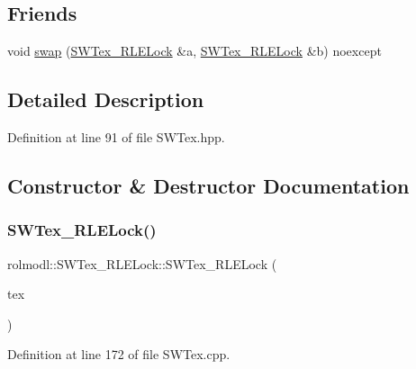 \subsection*{Friends}
\begin{DoxyCompactItemize}
\item 
void \mbox{\hyperlink{classrolmodl_1_1_s_w_tex___r_l_e_lock_ac8f8832fdc6e5941ef76802833c599dc}{swap}} (\mbox{\hyperlink{classrolmodl_1_1_s_w_tex___r_l_e_lock}{S\+W\+Tex\+\_\+\+R\+L\+E\+Lock}} \&a, \mbox{\hyperlink{classrolmodl_1_1_s_w_tex___r_l_e_lock}{S\+W\+Tex\+\_\+\+R\+L\+E\+Lock}} \&b) noexcept
\end{DoxyCompactItemize}


\subsection{Detailed Description}


Definition at line 91 of file S\+W\+Tex.\+hpp.



\subsection{Constructor \& Destructor Documentation}
\mbox{\label{classrolmodl_1_1_s_w_tex___r_l_e_lock_a6de44179fe9c3f0bf4b71c46b78bfe66}} 
\subsubsection{\texorpdfstring{SWTex\_RLELock()}{SWTex\_RLELock()}\hspace{0.1cm}{\footnotesize\ttfamily [1/3]}}
{\footnotesize\ttfamily rolmodl\+::\+S\+W\+Tex\+\_\+\+R\+L\+E\+Lock\+::\+S\+W\+Tex\+\_\+\+R\+L\+E\+Lock (\begin{DoxyParamCaption}\item[{\mbox{\hyperlink{classrolmodl_1_1_s_w_tex___r_l_e}{S\+W\+Tex\+\_\+\+R\+LE}} \&}]{tex }\end{DoxyParamCaption})\hspace{0.3cm}{\ttfamily [explicit]}}



Definition at line 172 of file S\+W\+Tex.\+cpp.

\mbox{\label{classrolmodl_1_1_s_w_tex___r_l_e_lock_a94b2c5bad7636a8c79295e03d0c27c32}} 
